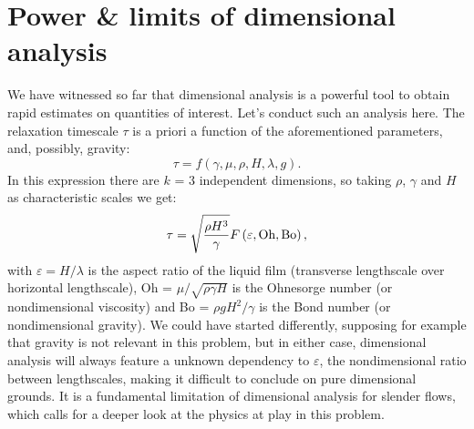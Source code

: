 \section{Power \& limits of dimensional analysis}
We have witnessed so far that dimensional analysis is a powerful tool to obtain rapid estimates on quantities of interest. Let's conduct such an analysis here. The relaxation timescale $\tau$ is a priori a function of the aforementioned parameters, and, possibly, gravity:
\begin{equation}
\tau = f(\gamma, \mu, \rho, H, \lambda, g).
\end{equation}
In this expression there are $k$ = 3 independent dimensions, so taking $\rho$, $\gamma$ and $H$ as characteristic scales we get:
\begin{equation}
\tau = \sqrt{\frac{\rho H^3}{\gamma}} F\left( \varepsilon, \text{Oh}, \text{Bo}\right),
\label{eq:relaxation_time_dimensional_analysis}
\end{equation}
with $\varepsilon = H/\lambda$ is the aspect ratio of the liquid film (transverse lengthscale over horizontal lengthscale), Oh = $\mu/\sqrt{\rho \gamma H}$ is the Ohnesorge number (or nondimensional viscosity) and Bo = $\rho g H^2 / \gamma$ is the Bond number (or nondimensional gravity). We could have started differently, supposing for example that gravity is not relevant in this problem, but in either case, dimensional analysis will always feature a unknown dependency to $\varepsilon$, the nondimensional ratio between lengthscales, making it difficult to conclude on pure dimensional grounds. It is a fundamental limitation of dimensional analysis for slender flows, which calls for a deeper look at the physics at play in this problem.
